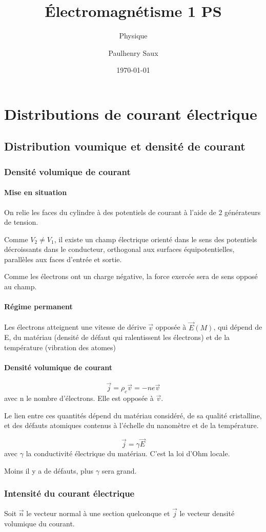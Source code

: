 \documentclass[french]{yLectureNote}
\title{Électromagnétisme 1 PS}
\subtitle{Physique}
\author{Paulhenry Saux}
\date{\today}
\renewcommand{\vec}{\overrightarrow}
\newcommand{\E}{\vec{E}(M)}
\begin{document}
\setcounter{chapter}{5}
\chapter{Distributions de courant électrique}
\section{Distribution voumique et densité de courant}
\subsection{Densité volumique de courant}
\subsubsection{Mise en situation}
On relie les faces du cylindre à des potentiels de courant à l'aide de 2 générateurs de tension.

Comme \(V_2\neq V_1\), il existe un champ électrique orienté dans le sens des potentiels décroissants dans le conducteur, orthogonal aux surfaces équipotentielles, parallèles aux faces d'entrée et sortie.

Comme les électrons ont un charge négative, la force exercée sera de sens opposé au champ.
\subsubsection{Régime permanent}
Les électrons atteignent une vitesse de dérive \(\vec{v}\) opposée à \(\E\), qui dépend de E, du matériau (densité de défaut qui ralentissent les électrons) et de la température (vibration des atomes)
\subsubsection{Densité volumique de courant}
\begin{definition}[DVC]
\[\vec{j} = \rho_c\vec{v} = -ne\vec{v}\] avec n le nombre d’électrons. Elle est opposée à \(\vec{v}\).
\end{definition}


Le lien entre ces quantités dépend du matériau considéré, de sa qualité cristalline, et des défauts atomiques contenus à l'échelle du nanomètre et de la température.

\[\vec{j} = \gamma \vec{E}\] avec \(\gamma\) la conductivité électrique du matériau. C'est la loi d'Ohm locale.

Moins il y a de défauts, plus \(\gamma\) sera grand.
\subsection{Intensité du courant électrique}
Soit \(\vec{n}\) le vecteur normal à une section quelconque et \(\vec{j}\) le vecteur densité volumique du courant.
\end{document}

